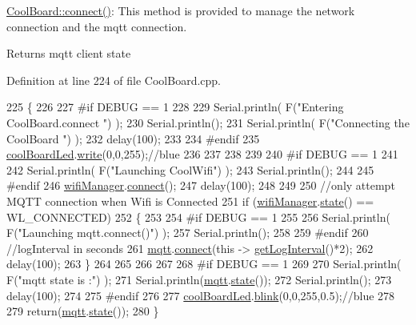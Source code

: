 \hyperlink{class_cool_board_a519de78b807f8ec6463ff484eb925918}{Cool\+Board\+::connect()}\+: This method is provided to manage the network connection and the mqtt connection.

\begin{DoxyReturn}{Returns}
mqtt client state 
\end{DoxyReturn}


Definition at line 224 of file Cool\+Board.\+cpp.


\begin{DoxyCode}
225 \{
226 
227 \textcolor{preprocessor}{#if DEBUG == 1  }
228 
229     Serial.println( F(\textcolor{stringliteral}{"Entering CoolBoard.connect "}) );
230     Serial.println();
231     Serial.println( F(\textcolor{stringliteral}{"Connecting the CoolBoard  "}) );
232     delay(100);
233 
234 \textcolor{preprocessor}{#endif}
235     \hyperlink{class_cool_board_a1b1d3c684a5baa56b08486e192fd8e97}{coolBoardLed}.\hyperlink{class_cool_board_led_a30fadd4cbec17ceea428bf7a32207e87}{write}(0,0,255);\textcolor{comment}{//blue}
236 
237     
238             
239     
240 \textcolor{preprocessor}{#if DEBUG == 1      }
241 
242     Serial.println( F(\textcolor{stringliteral}{"Launching CoolWifi"}) );
243     Serial.println();
244 
245 \textcolor{preprocessor}{#endif}
246     \hyperlink{class_cool_board_acd88e6003606b47479ebba81e4aceeca}{wifiManager}.\hyperlink{class_cool_wifi_ad060353050f40d032a2dbf9e54a768bf}{connect}();
247     delay(100);
248 
249 
250     \textcolor{comment}{//only attempt MQTT connection when Wifi is Connected}
251     \textcolor{keywordflow}{if} (\hyperlink{class_cool_board_acd88e6003606b47479ebba81e4aceeca}{wifiManager}.\hyperlink{class_cool_wifi_a1c7b4d82a4098d346e7593dce92039fa}{state}() == WL\_CONNECTED)
252     \{
253 
254 \textcolor{preprocessor}{    #if DEBUG == 1  }
255     
256         Serial.println( F(\textcolor{stringliteral}{"Launching mqtt.connect()"}) );
257         Serial.println();
258     
259 \textcolor{preprocessor}{    #endif  }
260         \textcolor{comment}{//logInterval in seconds}
261         \hyperlink{class_cool_board_a2399f44d7c23c1149a335cb3b46d90f1}{mqtt}.\hyperlink{class_cool_m_q_t_t_a50075d0ab23a327ab897fd6adad20eda}{connect}(\textcolor{keyword}{this} -> \hyperlink{class_cool_board_a7508e029f2ee17bb747ffab599285e0d}{getLogInterval}()*2);
262         delay(100);
263     \}
264     
265         
266     
267     
268 \textcolor{preprocessor}{#if DEBUG == 1}
269 
270     Serial.println( F(\textcolor{stringliteral}{"mqtt state is :"}) );
271     Serial.println(\hyperlink{class_cool_board_a2399f44d7c23c1149a335cb3b46d90f1}{mqtt}.\hyperlink{class_cool_m_q_t_t_a5d003307eff78efbd585e42b43b72b6d}{state}());
272     Serial.println();
273     delay(100);
274 
275 \textcolor{preprocessor}{#endif}
276 
277     \hyperlink{class_cool_board_a1b1d3c684a5baa56b08486e192fd8e97}{coolBoardLed}.\hyperlink{class_cool_board_led_a96e1ea13003eee34c9dbcef340404426}{blink}(0,0,255,0.5);\textcolor{comment}{//blue}
278 
279     \textcolor{keywordflow}{return}(\hyperlink{class_cool_board_a2399f44d7c23c1149a335cb3b46d90f1}{mqtt}.\hyperlink{class_cool_m_q_t_t_a5d003307eff78efbd585e42b43b72b6d}{state}());
280 \}
\end{DoxyCode}
